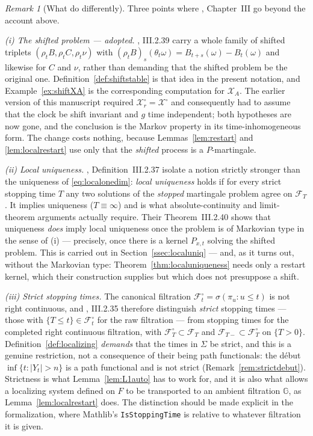 \documentclass[11pt,a4paper]{article}
\theoremstyle{plain}
\theoremstyle{definition}
\theoremstyle{remark}
\newtheorem{remark}[theorem]{Remark}
\newcommand{\Filt}{\mathcal{F}}
\newcommand{\XX}{\mathcal{X}}                  %
\newcommand{\JS}{\cite{JS03}}
\begin{document}
\begin{remark}[What \JS{} do differently]
  \label{rem:jsdiff}
  Three points where \JS, Chapter~III go beyond the account above.

  \emph{(i) The shifted problem --- adopted.}
  \JS, III.2.39 carry a whole family of shifted triplets
  $(\rho_t B, \rho_t C, \rho_t \nu)$ with
  $(\rho_t B)_s(\theta_t \omega) = B_{t+s}(\omega) - B_t(\omega)$ and likewise for
  $C$ and $\nu$, rather than demanding that the shifted problem be the original
  one.  Definition~\ref{def:shiftstable} is that idea in the present notation, and
  Example~\ref{ex:shiftXA} is the corresponding computation for $\XX_A$.  The
  earlier version of this manuscript required $\XX^\circ_r = \XX^\circ$ and
  consequently had to assume that the clock be shift invariant and $g$ time
  independent; both hypotheses are now gone, and the conclusion is the Markov
  property in its time-inhomogeneous form.  The change costs nothing, because
  Lemmas~\ref{lem:restart} and \ref{lem:localrestart} use only that the
  \emph{shifted} process is a $P$-martingale.

  \emph{(ii) Local uniqueness.}
  \JS, Definition~III.2.37 isolate a notion strictly stronger than the uniqueness
  of \eqref{eq:localonedim}: \emph{local uniqueness} holds if for every strict
  stopping time $T$ any two solutions of the \emph{stopped} martingale problem
  agree on $\Filt_T$.  It implies uniqueness ($T \equiv \infty$) and is what
  absolute-continuity and limit-theorem arguments actually require.  Their
  Theorem~III.2.40 shows that uniqueness \emph{does} imply local uniqueness once
  the problem is of Markovian type in the sense of (i) --- precisely, once there
  is a kernel $P_{x,t}$ solving the shifted problem.  This is carried out in
  Section~\ref{ssec:localuniq} --- and, as it turns out, without the Markovian
  type: Theorem~\ref{thm:localuniqueness} needs only a restart kernel, which
  their construction supplies but which does not presuppose a shift.

  \emph{(iii) Strict stopping times.}
  The canonical filtration $\Filt^\circ_t = \sigma(\pi_u : u \leq t)$ is not right
  continuous, and \JS, III.2.35 therefore distinguish \emph{strict} stopping
  times --- those with $\{T \leq t\} \in \Filt^\circ_t$ for the raw filtration ---
  from stopping times for the completed right continuous filtration, with
  $\Filt^\circ_T \subset \Filt_T$ and $\Filt_{T-} \subset \Filt^\circ_T$ on
  $\{T>0\}$.  Definition~\ref{def:localizing} \emph{demands} that the times in
  $\Sigma$ be strict, and this is a genuine restriction, not a consequence of
  their being path functionals: the d\'ebut $\inf\{t : |Y_t| > n\}$ is a path
  functional and is not strict (Remark~\ref{rem:strictdebut}).  Strictness is
  what Lemma~\ref{lem:L1auto} has to work for, and it is also what allows a
  localizing system defined on $F$ to be transported to an ambient filtration
  $\mathbb{G}$, as Lemma~\ref{lem:localrestart} does.  The distinction should be made
  explicit in the formalization, where Mathlib's \texttt{IsStoppingTime} is
  relative to whatever filtration it is given.
\end{remark}
\end{document}
